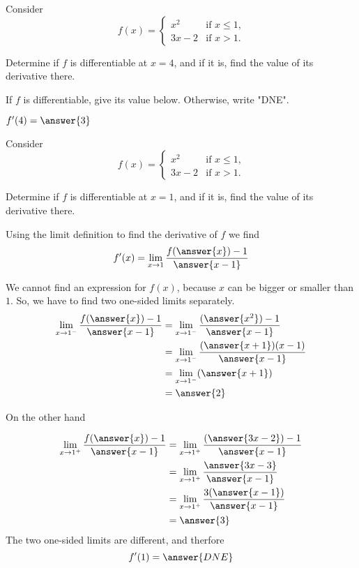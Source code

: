 \documentclass{ximera}
\author{Steven Gubkin \and Nela Lakos}
\begin{document}
\begin{exercise}

Consider 
\[
f(x) = \begin{cases} 
	x^2 &\text{if $x \leq 1$,}\\
	 3x-2 &\text{if  $x > 1$.}
\end{cases}
\]


Determine if $f$ is differentiable at $x=4$, and if it is, find the value of its derivative there.

\begin{prompt}
	If $f$ is differentiable, give its value below.  Otherwise, write "DNE".
	
	$f'(4) = \answer{3}$
\end{prompt}

\end{exercise}
\begin{exercise}

Consider 
\[
f(x) = \begin{cases} 
	x^2 &\text{if $x \leq 1$,}\\
	 3x-2 &\text{if  $x > 1$.}
\end{cases}
\]


Determine if $f$ is differentiable at $x=1$, and if it is, find the value of its derivative there.

Using the limit definition to find the derivative of $f$ we find
\[
f'(x)= \lim_{x\to1}\frac{f(\answer{x})-1}{\answer{x-1}}\\
\]

We cannot find an expression for $f(x)$, because $x$ can be bigger or smaller than $1$.
So, we have to find two one-sided limits separately.
\begin{align*}
 \lim_{x\to1^{-}}\frac{f(\answer{x})-1}{\answer{x-1}}&= \lim_{x\to1^{-}}\frac{(\answer{x^2})-1}{\answer{x-1}}\\
 &= \lim_{x\to1^{-}}\frac{(\answer{x+1})(x-1)}{\answer{x-1}}\\
  &= \lim_{x\to1^{-}}(\answer{x+1})\\
  &=\answer{2}
       \end{align*}

On the other hand


\begin{align*}
 \lim_{x\to1^{+}}\frac{f(\answer{x})-1}{\answer{x-1}}&= \lim_{x\to1^{+}}\frac{(\answer{3x-2})-1}{\answer{x-1}}\\
 &=\lim_{x\to1^{+}}\frac{\answer{3x-3}}{\answer{x-1}}\\
 &=\lim_{x\to1^{+}}\frac{3(\answer{x-1})}{\answer{x-1}}\\
  &=\answer{3}
       \end{align*}
The two one-sided limits are different, and therfore
\[
f'(1)= {\answer{DNE}}\\
\]

\end{exercise}
\end{document}
